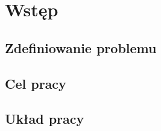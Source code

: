 \newpage

\section{Wstęp}

\subsection{Zdefiniowanie problemu}

\lipsum[1]

\subsection{Cel pracy}

\lipsum[1]

\subsection{Układ pracy}

\lipsum[1]
